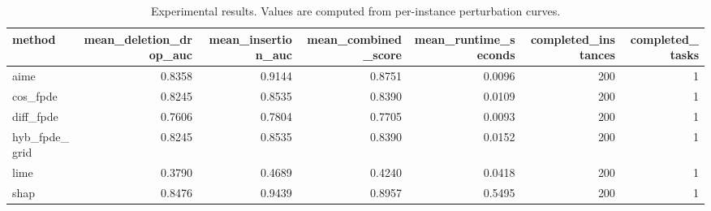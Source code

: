 \begin{table}[t]
\caption{Experimental results. Values are computed from per-instance perturbation curves.}
\label{tab:main_results_computed}
\centering
\begin{tabular}{lrrrrrr}
\toprule
method & mean\_deletion\_drop\_auc & mean\_insertion\_auc & mean\_combined\_score & mean\_runtime\_seconds & completed\_instances & completed\_tasks \\
\midrule
aime & 0.8358 & 0.9144 & 0.8751 & 0.0096 & 200 & 1 \\
cos\_fpde & 0.8245 & 0.8535 & 0.8390 & 0.0109 & 200 & 1 \\
diff\_fpde & 0.7606 & 0.7804 & 0.7705 & 0.0093 & 200 & 1 \\
hyb\_fpde\_grid & 0.8245 & 0.8535 & 0.8390 & 0.0152 & 200 & 1 \\
lime & 0.3790 & 0.4689 & 0.4240 & 0.0418 & 200 & 1 \\
shap & 0.8476 & 0.9439 & 0.8957 & 0.5495 & 200 & 1 \\
\bottomrule
\end{tabular}

\end{table}

